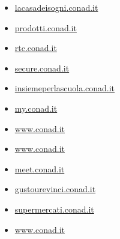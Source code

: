 \documentclass{article}
\begin{document}
\begin{itemize}
        \item \href{ http://lacasadeisogni.conad.it/ }{ lacasadeisogni.conad.it }
    
        
        
        \item \href{ http://prodotti.conad.it/ }{ prodotti.conad.it }
    
        
        
        \item \href{ http://rtc.conad.it }{ rtc.conad.it }
    
        
        
        \item \href{ http://secure.conad.it/ }{ secure.conad.it }
    
        
        
        \item \href{ https://insiemeperlascuola.conad.it/atpc/insiemeperlascuola/j/home }{ insiemeperlascuola.conad.it }
    
        
        
        \item \href{ https://my.conad.it/login.html?cb=https:/vincinatale.conad.it }{ my.conad.it }
    
        
        
        \item \href{ https://www.conad.it/ }{ www.conad.it }
    
        
        
        \item \href{ https://www.conad.it/assets/common/volantini/pac/v2023-/2023-5-Integrativa-Umbria.pdf\%3F\_u\%3D1677679008259 }{ www.conad.it }
    
        
        
        \item \href{ https://meet.conad.it/ }{ meet.conad.it }
    
        
        
        \item \href{ http://gustourevinci.conad.it/vincitori2020/gustourevinci.htm }{ gustourevinci.conad.it }
    
        
        
        \item \href{ http://supermercati.conad.it/ }{ supermercati.conad.it }
    
        
        
        \item \href{ https://www.conad.it/contenuti/landing\_CIA/CIA\_promo\_locale\_50\_settembre.html?utm\_source=crm\&utm\_medium=push\&utm\_campaign=cia\_2021\_SottoscrizioneCC\_Set\_02 }{ www.conad.it }
    

\end{itemize}
\end{document}

